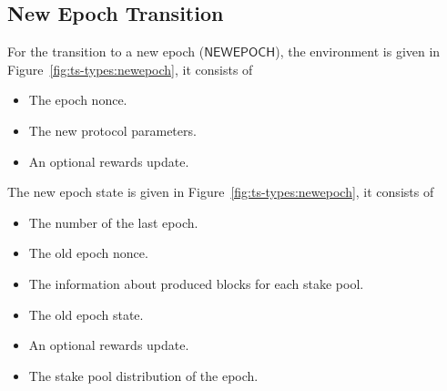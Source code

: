\clearpage

\subsection{New Epoch Transition}
\label{sec:new-epoch-trans}

For the transition to a new epoch ($\mathsf{NEWEPOCH}$), the environment is
given in Figure~\ref{fig:ts-types:newepoch}, it consists of

\begin{itemize}
\item The epoch nonce.
\item The new protocol parameters.
\item An optional rewards update.
\end{itemize}
The new epoch state is given in Figure~\ref{fig:ts-types:newepoch}, it consists
of

\begin{itemize}
\item The number of the last epoch.
\item The old epoch nonce.
\item The information about produced blocks for each stake pool.
\item The old epoch state.
\item An optional rewards update.
\item The stake pool distribution of the epoch.
\end{itemize}

